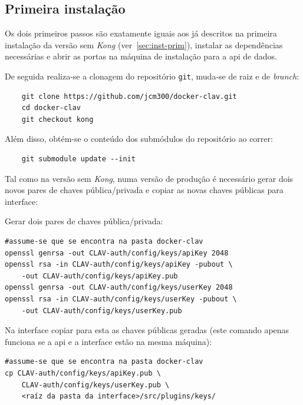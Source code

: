 \subsection{Primeira instalação}

Os dois primeiros passos são exatamente iguais aos já descritos na primeira instalação da versão sem \textit{Kong} (ver~\ref{sec:inst-prim}), instalar as dependências necessárias e abrir as portas na máquina de instalação para a \acrshort{api} de dados.

De seguida realiza-se a clonagem do repositório \texttt{git}, muda-se de raiz e de \textit{branch}:

\footnotesize
\begin{verbatim}
    git clone https://github.com/jcm300/docker-clav.git
    cd docker-clav
    git checkout kong
\end{verbatim}
\normalsize

Além disso, obtém-se o conteúdo dos submódulos do repositório ao correr:

\footnotesize
\begin{verbatim}
    git submodule update --init
\end{verbatim}
\normalsize

Tal como na versão sem \textit{Kong}, numa versão de produção é necessário gerar dois novos pares de chaves pública/privada e copiar as novas chaves públicas para interface:

\footnotesize
\begin{center}
\begin{minipage}[t]{0.49\textwidth}
Gerar dois pares de chaves pública/privada:
\begin{verbatim}
#assume-se que se encontra na pasta docker-clav 
openssl genrsa -out CLAV-auth/config/keys/apiKey 2048
openssl rsa -in CLAV-auth/config/keys/apiKey -pubout \
    -out CLAV-auth/config/keys/apiKey.pub
openssl genrsa -out CLAV-auth/config/keys/userKey 2048
openssl rsa -in CLAV-auth/config/keys/userKey -pubout \
    -out CLAV-auth/config/keys/userKey.pub
\end{verbatim}
\end{minipage}%
\begin{minipage}[t]{0.49\textwidth}
Na interface copiar para esta as chaves públicas geradas (este comando apenas funciona se a \acrshort{api} e a interface estão na mesma máquina):
\begin{verbatim}
#assume-se que se encontra na pasta docker-clav 
cp CLAV-auth/config/keys/apiKey.pub \
    CLAV-auth/config/keys/userKey.pub \
    <raíz da pasta da interface>/src/plugins/keys/
\end{verbatim}
\end{minipage}
\end{center}
\normalsize

